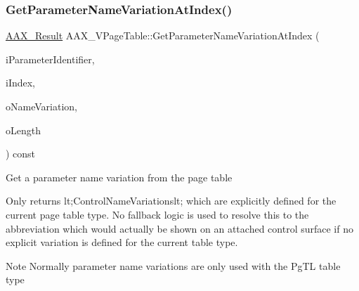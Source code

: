 \subsubsection{\texorpdfstring{GetParameterNameVariationAtIndex()}{GetParameterNameVariationAtIndex()}}
{\footnotesize\ttfamily \mbox{\hyperlink{a00392_a4d8f69a697df7f70c3a8e9b8ee130d2f}{A\+A\+X\+\_\+\+Result}} A\+A\+X\+\_\+\+V\+Page\+Table\+::\+Get\+Parameter\+Name\+Variation\+At\+Index (\begin{DoxyParamCaption}\item[{\mbox{\hyperlink{a00392_ab4e01b971dac1b25632fd9f710dd8f77}{A\+A\+X\+\_\+\+C\+Page\+Table\+Param\+ID}}}]{i\+Parameter\+Identifier,  }\item[{int32\+\_\+t}]{i\+Index,  }\item[{\mbox{\hyperlink{a01873}{A\+A\+X\+\_\+\+I\+String}} \&}]{o\+Name\+Variation,  }\item[{int32\+\_\+t \&}]{o\+Length }\end{DoxyParamCaption}) const\hspace{0.3cm}{\ttfamily [virtual]}}





Get a parameter name variation from the page table

Only returns {\ttfamily lt;Control\+Name\+Variationslt;} which are explicitly defined for the current page table type. No fallback logic is used to resolve this to the abbreviation which would actually be shown on an attached control surface if no explicit variation is defined for the current table type.

\begin{DoxyNote}{Note}
Normally parameter name variations are only used with the {\ttfamily \textquotesingle{}Pg\+TL\textquotesingle{}} table type
\end{DoxyNote}

